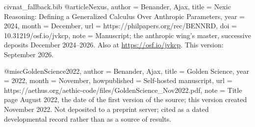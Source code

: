 \begin{filecontents}[overwrite]{civnat_fallback.bib}
@article{Nexus,
  author      = {Benander, Ajax},
  title       = {Nexic Reasoning: Defining a Generalized Calculus Over Anthropic Parameters},
  year        = {2024},
  month       = {December},
  url         = {https://philpapers.org/rec/BENNRD},
  doi         = {10.31219/osf.io/jvkcp},
  note        = {Manuscript; the anthropic wing's master, successive deposits
                 December 2024--2026. Also at \url{https://osf.io/jvkcp}.
                 This version: September 2026.}
}

@misc{GoldenScience2022,
  author       = {Benander, Ajax},
  title        = {Golden Science},
  year         = {2022},
  month        = {November},
  howpublished = {Self-hosted manuscript},
  url          = {https://aethus.org/aethic-code/files/GoldenScience_Nov2022.pdf},
  note         = {Title page August 2022, the date of the first version of the source; this version created November 2022. Not deposited to a
                  preprint server; cited as a dated developmental record rather than
                  as a source of results.}
}
\end{filecontents}
